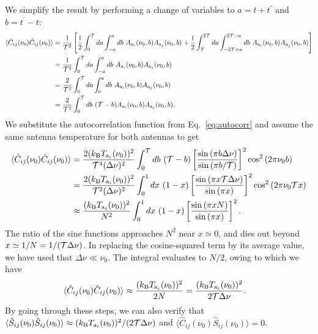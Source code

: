 \documentclass[11pt]{article}
\numberwithin{equation}{section}
\newcommand{\kb}{k_{\rm B}}
\begin{document}
We simplify the result by performing a change of variables to $a = t + t^\prime$ and $b = t^\prime - t$:
\begin{align}
  \langle \hat{C}_{ij}(\nu_0) \hat{C}_{ij}(\nu_0) \rangle & = \frac{1}{{\cal T}^2} \left[ \frac12 \int_0^{\cal T} da \int_{-a}^{a} db \ A_{{\rm a}_i}(\nu_0, b) A_{{\rm a}_j}(\nu_0, b) + \frac12 \int_{\cal T}^{2 \cal T} da \int_{- 2{\cal T} + a}^{2{\cal T} - a} db \ A_{{\rm a}_i}(\nu_0, b) A_{{\rm a}_j}(\nu_0, b) \right] \notag \\
  & = \frac{1}{{\cal T}^2} \int_0^{\cal T} da \int_{-a}^{a} db \ A_{{\rm a}_i}(\nu_0, b) A_{{\rm a}_j}(\nu_0, b) \notag \\
  & = \frac{2}{{\cal T}^2} \int_0^{\cal T} da \int_{0}^{a} db \ A_{{\rm a}_i}(\nu_0, b) A_{{\rm a}_j}(\nu_0, b) \notag \\
  & = \frac{2}{{\cal T}^2} \int_{0}^{\cal T} db \ ({\cal T} - b) A_{{\rm a}_i}(\nu_0, b) A_{{\rm a}_j}(\nu_0, b) \mbox{.}
\end{align}
We substitute the autocorrelation function from Eq.~\eqref{eq:autocorr} and assume the same antenna temperature for both antennas to get
\begin{align}
  \langle \hat{C}_{ij}(\nu_0) \hat{C}_{ij}(\nu_0) \rangle & = \frac{2 (\kb T_{{\rm a}_i}(\nu_0))^2}{{\cal T}^4 (\Delta\nu)^2} \int_{0}^{\cal T} db \ ({\cal T} - b) \left[ \frac{ \sin{(\pi b \Delta\nu)} }{ \sin{(\pi b/\mathcal{T})} } \right]^2 \cos^2{(2 \pi \nu_0 b)} \notag \\
  & = \frac{2 (\kb T_{{\rm a}_i}(\nu_0))^2}{{\cal T}^2 (\Delta\nu)^2} \int_{0}^{1} dx \ (1 - x) \left[ \frac{ \sin{(\pi x {\cal T} \Delta\nu )} }{ \sin{(\pi x)} } \right]^2 \cos^2{(2 \pi \nu_0 {\cal T} x)} \notag \\
  & \approx \frac{(\kb T_{{\rm a}_i}(\nu_0))^2}{N^2} \int_{0}^{1} dx \ (1 - x) \left[ \frac{ \sin{(\pi x N )} }{ \sin{(\pi x)} } \right]^2 \mbox{.}
\end{align}
The ratio of the sine functions approaches $N^2$ near $x \simeq 0$, and dies out beyond $x \simeq 1/N = 1/({\cal T} \Delta \nu)$. In replacing the cosine-squared term by its average value, we have used that $\Delta \nu \ll \nu_0$. The integral evaluates to $N/2$, owing to which we have
\begin{align}
  \langle \hat{C}_{ij}(\nu_0) \hat{C}_{ij}(\nu_0) \rangle & \approx \frac{(\kb T_{{\rm a}_i}(\nu_0))^2}{2 N} = \frac{(\kb T_{{\rm a}_i}(\nu_0))^2}{2 {\cal T} \Delta \nu} \mbox{.}
\end{align}
By going through these steps, we can also verify that $\langle \hat{S}_{ij}(\nu_0) \hat{S}_{ij}(\nu_0) \rangle \approx (\kb T_{{\rm a}_i}(\nu_0))^2/(2 {\cal T} \Delta \nu)$ and $\langle \hat{C}_{ij}(\nu_0) \hat{S}_{ij}(\nu_0) \rangle = 0$.
\end{document}
